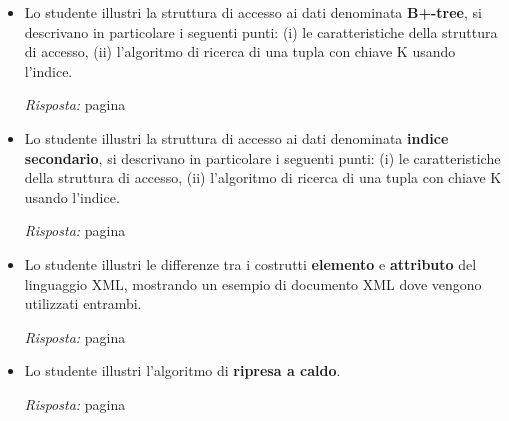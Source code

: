 \documentclass[a4paper]{article}
\begin{document}
\begin{itemize}
		\item Lo studente illustri la struttura di accesso ai dati denominata \textbf{B+-tree}, si descrivano in particolare i seguenti punti: (i) le caratteristiche della struttura di accesso, (ii) l'algoritmo di ricerca di una tupla con chiave K usando l'indice.
		
		\emph{Risposta:} pagina \pageref{dom: B+-tree}
		
		\item Lo studente illustri la struttura di accesso ai dati denominata \textbf{indice secondario}, si descrivano in particolare i seguenti punti: (i) le caratteristiche della struttura di accesso, (ii) l'algoritmo di ricerca di una tupla con chiave K usando l'indice.
		
		\emph{Risposta:} pagina \pageref{dom: indice secondario}
		
		\item Lo studente illustri le differenze tra i costrutti \textbf{elemento} e \textbf{attributo} del linguaggio XML, mostrando un esempio di documento XML dove vengono utilizzati entrambi.
		
		\emph{Risposta:} pagina \pageref{dom: elemento e attributo in XML}
		
		\item Lo studente illustri l'algoritmo di \textbf{ripresa a caldo}.
		
		\emph{Risposta:} pagina \pageref{dom: ripresa a caldo}
	\end{itemize}
\end{document}
